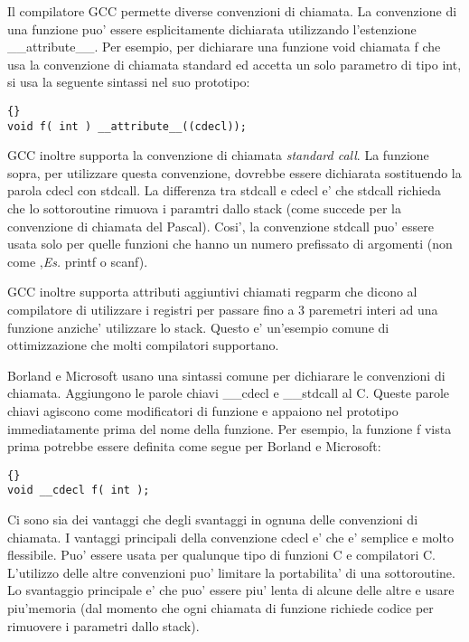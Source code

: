 Il compilatore GCC permette diverse convenzioni di chiamata. La convenzione
di una funzione puo' essere esplicitamente dichiarata utilizzando
l'estenzione {\code \_\_attribute\_\_}. 
Per esempio, per dichiarare una funzione void chiamata {\code f} che usa 
la convenzione di chiamata standard
ed accetta un solo parametro di tipo {\code int}, si usa la seguente
sintassi nel suo prototipo:
\begin{lstlisting}[stepnumber=0]{}
void f( int ) __attribute__((cdecl));
\end{lstlisting}
GCC inoltre supporta la convenzione di chiamata \emph{standard call}. La funzione sopra, per utilizzare questa
convenzione, dovrebbe essere dichiarata sostituendo la parola
{\code cdecl} con {\code stdcall}. La differenza tra {\code stdcall} e
{\code cdecl} e' che {\code stdcall} richieda che lo sottoroutine
rimuova i paramtri dallo stack (come succede per la convenzione di 
chiamata del Pascal). Cosi', la convenzione {\code stdcall} puo'
essere usata solo per quelle funzioni che hanno un numero prefissato
di argomenti (non come ,\emph{Es.} {\code printf} o {\code scanf}).

GCC inoltre supporta attributi aggiuntivi chiamati {\code regparm}
 che dicono al compilatore
di utilizzare i registri per passare fino a 3 paremetri interi ad
una funzione anziche' utilizzare lo stack. Questo e' un'esempio comune
di ottimizzazione che molti compilatori supportano. 

Borland e Microsoft usano una sintassi comune per dichiarare
le convenzioni di chiamata. Aggiungono le parole chiavi {\code \_\_cdecl}
 e {\code \_\_stdcall} al C. Queste parole chiavi agiscono come
modificatori di funzione e appaiono nel prototipo immediatamente prima
del nome della funzione. Per esempio, la funzione {\code f} vista prima
potrebbe essere definita come segue per Borland e Microsoft: 
\begin{lstlisting}[stepnumber=0]{}
void __cdecl f( int );
\end{lstlisting}

Ci sono sia dei vantaggi che degli svantaggi in ognuna delle convenzioni
di chiamata. I vantaggi principali della convenzione {\code cdecl} e' che e' semplice e molto flessibile. Puo' essere usata
per qualunque tipo di funzioni C e compilatori C. L'utilizzo delle altre
convenzioni puo' limitare la portabilita' di una sottoroutine. Lo 
svantaggio principale e' che puo' essere piu' lenta di alcune delle
altre e usare piu'memoria (dal momento che ogni chiamata di funzione
richiede codice per rimuovere i parametri dallo stack). 

